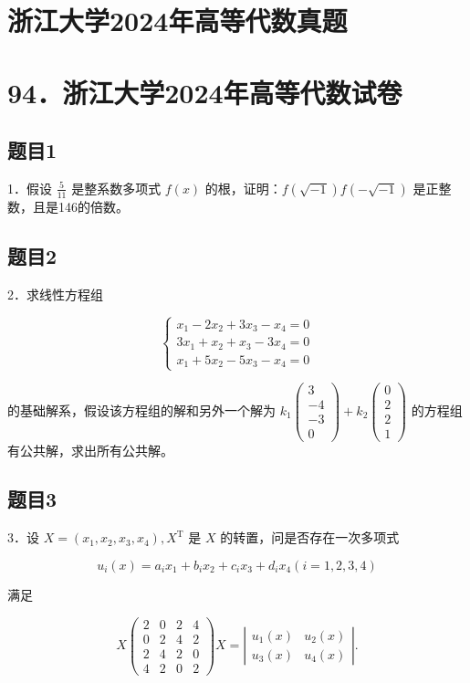 \documentclass{article}
\begin{document}
\section*{浙江大学2024年高等代数真题}
\section*{94．浙江大学2024年高等代数试卷}

\subsection{题目1}
1．假设 \(\frac{5}{11}\) 是整系数多项式 \(f(x)\) 的根，证明：\(f(\sqrt{-1}) f(-\sqrt{-1})\) 是正整数，且是146的倍数。

\subsection{题目2}
2．求线性方程组

\[
\left\{\begin{array}{r}
x_{1}-2 x_{2}+3 x_{3}-x_{4}=0 \\
3 x_{1}+x_{2}+x_{3}-3 x_{4}=0 \\
x_{1}+5 x_{2}-5 x_{3}-x_{4}=0
\end{array}\right.
\]

的基础解系，假设该方程组的解和另外一个解为 \(k_{1}\left(\begin{array}{c}3 \\ -4 \\ -3 \\ 0\end{array}\right)+k_{2}\left(\begin{array}{l}0 \\ 2 \\ 2 \\ 1\end{array}\right)\) 的方程组有公共解，求出所有公共解。

\subsection{题目3}
3．设 \(X=\left(x_{1}, x_{2}, x_{3}, x_{4}\right), X^{\mathrm{T}}\) 是 \(X\) 的转置，问是否存在一次多项式

\[
u_{i}(x)=a_{i} x_{1}+b_{i} x_{2}+c_{i} x_{3}+d_{i} x_{4}(i=1,2,3,4)
\]

满足

\[
X\left(\begin{array}{llll}
2 & 0 & 2 & 4 \\
0 & 2 & 4 & 2 \\
2 & 4 & 2 & 0 \\
4 & 2 & 0 & 2
\end{array}\right) X=\left|\begin{array}{ll}
u_{1}(x) & u_{2}(x) \\
u_{3}(x) & u_{4}(x)
\end{array}\right| .
\]
\end{document}
